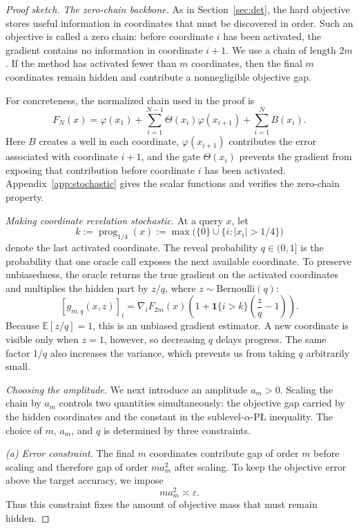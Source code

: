 \documentclass[11pt]{article}
\newcommand{\E}{\mathbb{E}}
\newcommand{\abs}[1]{\left\lvert #1\right\rvert}
\newcommand{\prog}{\operatorname{prog}}
\begin{document}
\begin{proof}[Proof sketch]
\emph{The zero-chain backbone.}
As in Section~\ref{sec:det}, the hard objective stores useful information in coordinates that must be discovered in
order. Such an objective is called a zero chain: before coordinate \(i\) has been activated, the gradient contains no
information in coordinate \(i+1\). We use a chain of length \(2m\). If the method has activated fewer than \(m\)
coordinates, then the final \(m\) coordinates remain hidden and contribute a nonnegligible objective gap.

For concreteness, the normalized chain used in the proof is
\[
F_N(x)
=
\varphi(x_1)
+\sum_{i=1}^{N-1}\Theta(x_i)\varphi(x_{i+1})
+\sum_{i=1}^N B(x_i).
\]
Here \(B\) creates a well in each coordinate, \(\varphi(x_{i+1})\) contributes the error associated with coordinate
\(i+1\), and the gate \(\Theta(x_i)\) prevents the gradient from exposing that contribution before coordinate \(i\)
has been activated. Appendix~\ref{app:stochastic} gives the scalar functions and verifies the zero-chain property.

\emph{Making coordinate revelation stochastic.}
At a query \(x\), let
\[
k:=\prog_{1/4}(x)
:=
\max\bigl(\{0\}\cup\{i:\abs{x_i}>1/4\}\bigr)
\]
denote the last activated coordinate. The reveal probability \(q\in(0,1]\) is the probability that one oracle call
exposes the next available coordinate. To preserve unbiasedness, the oracle returns the true gradient on the activated
coordinates and multiplies the hidden part by \(z/q\), where \(z\sim\mathrm{Bernoulli}(q)\):
\[
[g_{m,q}(x,z)]_i
=
\nabla_iF_{2m}(x)
\left(
1+\mathbf 1\{i>k\}\left(\frac{z}{q}-1\right)
\right).
\]
Because \(\E[z/q]=1\), this is an unbiased gradient estimator. A new coordinate is visible only when \(z=1\), however,
so decreasing \(q\) delays progress. The same factor \(1/q\) also increases the variance, which prevents us from taking
\(q\) arbitrarily small.

\emph{Choosing the amplitude.}
We next introduce an amplitude \(a_m>0\). Scaling the chain by \(a_m\) controls two quantities simultaneously: the
objective gap carried by the hidden coordinates and the constant in the sublevel-\(\alpha\)-P\L{} inequality. The
choice of \(m\), \(a_m\), and \(q\) is determined by three constraints.

\smallskip
\noindent\emph{(a) Error constraint.}
The final \(m\) coordinates contribute gap of order \(m\) before scaling and therefore gap of order \(ma_m^2\) after
scaling. To keep the objective error above the target accuracy, we impose
\begin{equation}
\label{eq:sto-rate-constraint}
ma_m^2\asymp\varepsilon.
\end{equation}
Thus this constraint fixes the amount of objective mass that must remain hidden.


\end{proof}
\end{document}
